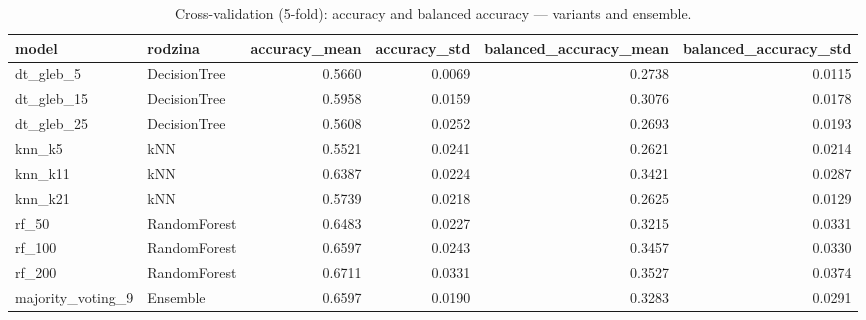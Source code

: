 \begin{table}
\caption{Cross-validation (5-fold): accuracy and balanced accuracy — variants and ensemble.}
\label{tab:detailed}
\begin{tabular}{llrrrr}
\toprule
model & rodzina & accuracy\_mean & accuracy\_std & balanced\_accuracy\_mean & balanced\_accuracy\_std \\
\midrule
dt\_gleb\_5 & DecisionTree & 0.5660 & 0.0069 & 0.2738 & 0.0115 \\
dt\_gleb\_15 & DecisionTree & 0.5958 & 0.0159 & 0.3076 & 0.0178 \\
dt\_gleb\_25 & DecisionTree & 0.5608 & 0.0252 & 0.2693 & 0.0193 \\
knn\_k5 & kNN & 0.5521 & 0.0241 & 0.2621 & 0.0214 \\
knn\_k11 & kNN & 0.6387 & 0.0224 & 0.3421 & 0.0287 \\
knn\_k21 & kNN & 0.5739 & 0.0218 & 0.2625 & 0.0129 \\
rf\_50 & RandomForest & 0.6483 & 0.0227 & 0.3215 & 0.0331 \\
rf\_100 & RandomForest & 0.6597 & 0.0243 & 0.3457 & 0.0330 \\
rf\_200 & RandomForest & 0.6711 & 0.0331 & 0.3527 & 0.0374 \\
majority\_voting\_9 & Ensemble & 0.6597 & 0.0190 & 0.3283 & 0.0291 \\
\bottomrule
\end{tabular}
\end{table}
